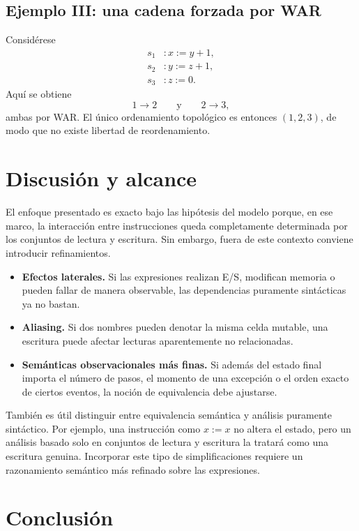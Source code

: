 \documentclass[letterpaper,oneside]{article}
\theoremstyle{remark}
\begin{document}
\subsection{Ejemplo III: una cadena forzada por WAR}

Considérese
\[
\begin{aligned}
  s_1 &: x := y + 1, \\
  s_2 &: y := z + 1, \\
  s_3 &: z := 0.
\end{aligned}
\]
Aquí se obtiene
\[
  1 \to 2
  \qquad\text{y}\qquad
  2 \to 3,
\]
ambas por WAR. El único ordenamiento topológico es entonces $(1,2,3)$, de modo que no existe libertad de reordenamiento.

\section{Discusión y alcance}

El enfoque presentado es exacto bajo las hipótesis del modelo porque, en ese marco, la interacción entre instrucciones queda completamente determinada por los conjuntos de lectura y escritura. Sin embargo, fuera de este contexto conviene introducir refinamientos.

\begin{itemize}[leftmargin=2.2em]
  \item \textbf{Efectos laterales.} Si las expresiones realizan E/S, modifican memoria o pueden fallar de manera observable, las dependencias puramente sintácticas ya no bastan.
  \item \textbf{Aliasing.} Si dos nombres pueden denotar la misma celda mutable, una escritura puede afectar lecturas aparentemente no relacionadas.
  \item \textbf{Semánticas observacionales más finas.} Si además del estado final importa el número de pasos, el momento de una excepción o el orden exacto de ciertos eventos, la noción de equivalencia debe ajustarse.
\end{itemize}

También es útil distinguir entre equivalencia semántica y análisis puramente sintáctico. Por ejemplo, una instrucción como $x := x$ no altera el estado, pero un análisis basado solo en conjuntos de lectura y escritura la tratará como una escritura genuina. Incorporar este tipo de simplificaciones requiere un razonamiento semántico más refinado sobre las expresiones.

\section{Conclusión}
\end{document}
